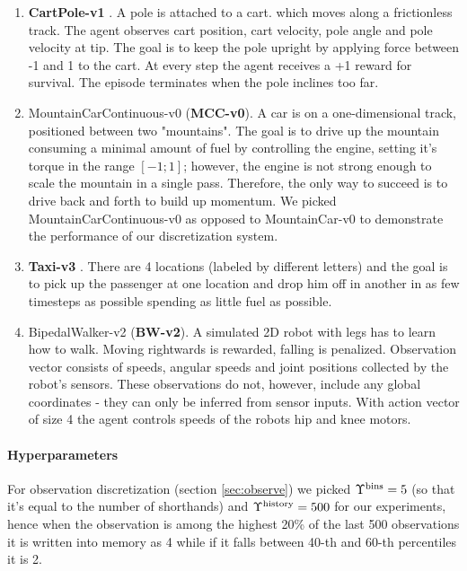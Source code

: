 \begin{enumerate}
\item \textbf{CartPole-v1} \cite{cartpole}.
A pole is attached to a cart.  which moves along a frictionless track.
The agent observes cart position, cart velocity, pole angle and pole velocity at tip.
The goal is to keep the pole upright by applying force between -1 and 1 to the cart.
At every step the agent receives a +1 reward for survival.
The episode terminates when the pole inclines too far.
\item MountainCarContinuous-v0 (\textbf{MCC-v0})\cite{mountain_car}.
A car is on a one-dimensional track, positioned between two "mountains". 
The goal is to drive up the mountain consuming a minimal amount of fuel by controlling the engine, setting it's torque in the range $[-1;1]$; however, the engine is not strong enough to scale the mountain in a single pass.
Therefore, the only way to succeed is to drive back and forth to build up momentum. 
We picked MountainCarContinuous-v0 as opposed to MountainCar-v0 to demonstrate the performance of our discretization system.
\item \textbf{Taxi-v3} \cite{taxi}. There are 4 locations (labeled by different letters) and the goal is to pick up the passenger at one location and drop him off in another in as few timesteps as possible spending as little fuel as possible.
\item BipedalWalker-v2 (\textbf{BW-v2}). A simulated 2D robot with legs has to learn how to walk. 
Moving rightwards is rewarded, falling is penalized.
Observation vector consists of speeds, angular speeds and joint positions collected by the robot's sensors.
These observations do not, however, include any global coordinates - they can only be inferred from sensor inputs.
With action vector of size 4 the agent controls speeds of the robots hip and knee motors.
\end{enumerate}

\paragraph{Hyperparameters}

For observation discretization (section \ref{sec:observe}) we picked $\Upsilon^\text{bins}=5$ (so that it's equal to the number of shorthands) and $\Upsilon^\text{history}=500$ for our experiments, hence when the observation is among the highest 20\% of the last 500 observations it is written into memory as 4 while if it falls between 40-th and 60-th percentiles it is 2.

